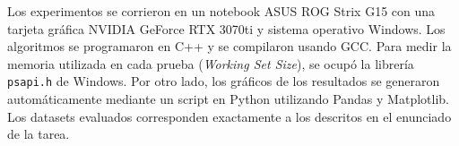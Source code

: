 Los experimentos se corrieron en un notebook ASUS ROG Strix G15 con una tarjeta gráfica NVIDIA GeForce RTX 3070ti y sistema operativo Windows. Los algoritmos se programaron en C++ y se compilaron usando GCC. Para medir la memoria utilizada en cada prueba (\textit{Working Set Size}), se ocupó la librería \texttt{psapi.h} de Windows. Por otro lado, los gráficos de los resultados se generaron automáticamente mediante un script en Python utilizando Pandas y Matplotlib. Los datasets evaluados corresponden exactamente a los descritos en el enunciado de la tarea.